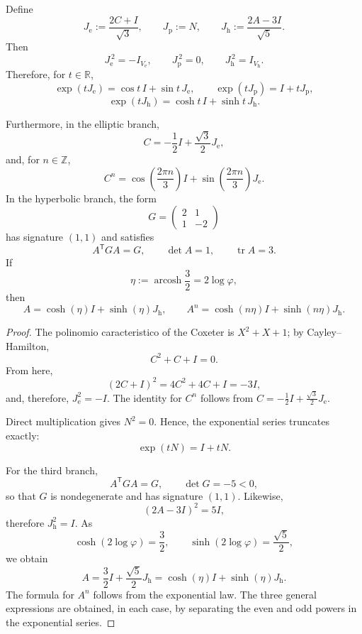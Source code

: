 \begin{theorem}
\label{thm:tres-generadores-concretos-trit}
Define
\[
J_{\mathrm e}:=\frac{2C+I}{\sqrt3},
\qquad
J_{\mathrm p}:=N,
\qquad
J_{\mathrm h}:=\frac{2A-3I}{\sqrt5}.
\]
Then
\[
J_{\mathrm e}^{\,2}=-I_{V_{\mathrm e}},
\qquad
J_{\mathrm p}^{\,2}=0,
\qquad
J_{\mathrm h}^{\,2}=I_{V_{\mathrm h}}.
\]
Therefore, for \(t\in\mathbb R\),
\[
\exp(tJ_{\mathrm e})
=\cos t\,I+\sin t\,J_{\mathrm e},
\qquad
\exp(tJ_{\mathrm p})
=I+tJ_{\mathrm p},
\]
\[
\exp(tJ_{\mathrm h})
=\cosh t\,I+\sinh t\,J_{\mathrm h}.
\]

Furthermore, in the elliptic branch,
\[
C=-\frac12I+\frac{\sqrt3}{2}J_{\mathrm e},
\]
and, for \(n\in\mathbb Z\),
\[
C^n=
\cos\!\left(\frac{2\pi n}{3}\right)I
+\sin\!\left(\frac{2\pi n}{3}\right)J_{\mathrm e}.
\]
In the hyperbolic branch, the form
\[
G=
\begin{pmatrix}
2&1\\
1&-2
\end{pmatrix}
\]
has signature \((1,1)\) and satisfies
\[
A^{\mathsf T}GA=G,\qquad
\det A=1,\qquad
\operatorname{tr}A=3.
\]
If
\[
\eta:=\operatorname{arcosh}\frac32=2\log\varphi,
\]
then
\[
A=\cosh(\eta)I+\sinh(\eta)J_{\mathrm h},
\qquad
A^n=\cosh(n\eta)I+\sinh(n\eta)J_{\mathrm h}.
\]
\end{theorem}

\begin{proof}
The polinomio caracteristico of the Coxeter is \(X^2+X+1\); by
Cayley--Hamilton,
\[
C^2+C+I=0.
\]
From here,
\[
(2C+I)^2=4C^2+4C+I=-3I,
\]
and, therefore, \(J_{\mathrm e}^2=-I\). The identity for \(C^n\) follows from
\(C=-\frac12I+\frac{\sqrt3}{2}J_{\mathrm e}\).

Direct multiplication gives \(N^2=0\). Hence, the exponential series
truncates exactly:
\[
\exp(tN)=I+tN.
\]

For the third branch,
\[
A^{\mathsf T}GA=G,\qquad
\det G=-5<0,
\]
so that \(G\) is nondegenerate and has signature \((1,1)\). Likewise,
\[
(2A-3I)^2=5I,
\]
therefore \(J_{\mathrm h}^2=I\). As
\[
\cosh(2\log\varphi)=\frac32,
\qquad
\sinh(2\log\varphi)=\frac{\sqrt5}{2},
\]
we obtain
\[
A=\frac32I+\frac{\sqrt5}{2}J_{\mathrm h}
=\cosh(\eta)I+\sinh(\eta)J_{\mathrm h}.
\]
The formula for \(A^n\) follows from the exponential law. The three general
expressions are obtained, in each case, by separating the even and odd
powers in the exponential series.
\end{proof}

